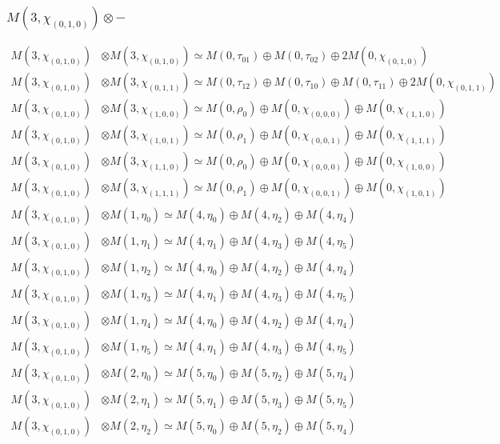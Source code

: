 \subsubsection{$ M(3,\chi_{(0,1,0)})\otimes -$}
\begin{align*}
M(3,\chi_{(0,1,0)}) &\otimes M(3,\chi_{(0,1,0)}) \simeq M(0,\tau_{01}) \oplus M(0,\tau_{02}) \oplus 2 M(0,\chi_{(0,1,0)}) \\
M(3,\chi_{(0,1,0)}) &\otimes M(3,\chi_{(0,1,1)}) \simeq M(0,\tau_{12}) \oplus M(0,\tau_{10}) \oplus M(0,\tau_{11}) \oplus 2 M(0,\chi_{(0,1,1)}) \\
M(3,\chi_{(0,1,0)}) &\otimes M(3,\chi_{(1,0,0)}) \simeq M(0,\rho_{0}) \oplus M(0,\chi_{(0,0,0)}) \oplus M(0,\chi_{(1,1,0)}) \\
M(3,\chi_{(0,1,0)}) &\otimes M(3,\chi_{(1,0,1)}) \simeq M(0,\rho_{1}) \oplus M(0,\chi_{(0,0,1)}) \oplus M(0,\chi_{(1,1,1)}) \\
M(3,\chi_{(0,1,0)}) &\otimes M(3,\chi_{(1,1,0)}) \simeq M(0,\rho_{0}) \oplus M(0,\chi_{(0,0,0)}) \oplus M(0,\chi_{(1,0,0)}) \\
M(3,\chi_{(0,1,0)}) &\otimes M(3,\chi_{(1,1,1)}) \simeq M(0,\rho_{1}) \oplus M(0,\chi_{(0,0,1)}) \oplus M(0,\chi_{(1,0,1)}) \\
M(3,\chi_{(0,1,0)}) &\otimes M(1,\eta_{0}) \simeq M(4,\eta_{0}) \oplus M(4,\eta_{2}) \oplus M(4,\eta_{4}) \\
M(3,\chi_{(0,1,0)}) &\otimes M(1,\eta_{1}) \simeq M(4,\eta_{1}) \oplus M(4,\eta_{3}) \oplus M(4,\eta_{5}) \\
M(3,\chi_{(0,1,0)}) &\otimes M(1,\eta_{2}) \simeq M(4,\eta_{0}) \oplus M(4,\eta_{2}) \oplus M(4,\eta_{4}) \\
M(3,\chi_{(0,1,0)}) &\otimes M(1,\eta_{3}) \simeq M(4,\eta_{1}) \oplus M(4,\eta_{3}) \oplus M(4,\eta_{5}) \\
M(3,\chi_{(0,1,0)}) &\otimes M(1,\eta_{4}) \simeq M(4,\eta_{0}) \oplus M(4,\eta_{2}) \oplus M(4,\eta_{4}) \\
M(3,\chi_{(0,1,0)}) &\otimes M(1,\eta_{5}) \simeq M(4,\eta_{1}) \oplus M(4,\eta_{3}) \oplus M(4,\eta_{5}) \\
M(3,\chi_{(0,1,0)}) &\otimes M(2,\eta_{0}) \simeq M(5,\eta_{0}) \oplus M(5,\eta_{2}) \oplus M(5,\eta_{4}) \\
M(3,\chi_{(0,1,0)}) &\otimes M(2,\eta_{1}) \simeq M(5,\eta_{1}) \oplus M(5,\eta_{3}) \oplus M(5,\eta_{5}) \\
M(3,\chi_{(0,1,0)}) &\otimes M(2,\eta_{2}) \simeq M(5,\eta_{0}) \oplus M(5,\eta_{2}) \oplus M(5,\eta_{4}) \\

\end{align*}
